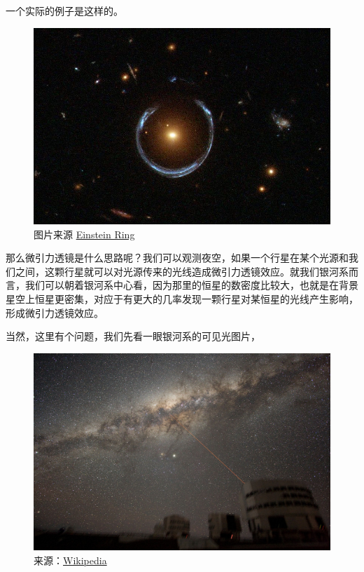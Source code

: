 \documentclass[letterpaper,10pt,english]{sphinxmanual}
\begin{document}
一个实际的例子是这样的。
\begin{figure}[htbp]
\centering
\capstart

\includegraphics{A_Horseshoe_Einstein_Ring_from_Hubble.JPG}
\caption{图片来源 \href{https://en.wikipedia.org/wiki/Einstein\_ring}{Einstein Ring}}\end{figure}

那么微引力透镜是什么思路呢？我们可以观测夜空，如果一个行星在某个光源和我们之间，这颗行星就可以对光源传来的光线造成微引力透镜效应。就我们银河系而言，我们可以朝着银河系中心看，因为那里的恒星的数密度比较大，也就是在背景星空上恒星更密集，对应于有更大的几率发现一颗行星对某恒星的光线产生影响，形成微引力透镜效应。

当然，这里有个问题，我们先看一眼银河系的可见光图片，
\begin{figure}[htbp]
\centering
\capstart

\includegraphics{1280px-ESO-VLT-Laser-phot-33a-07.jpg}
\caption{来源：\href{https://en.wikipedia.org/wiki/File:ESO-VLT-Laser-phot-33a-07.jpg}{Wikipedia}}\end{figure}
\end{document}
